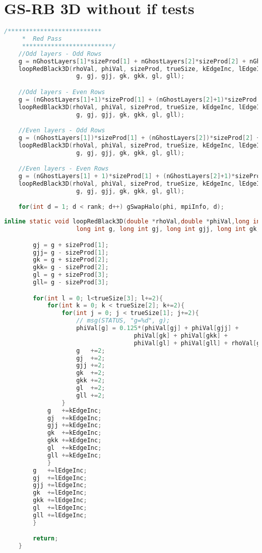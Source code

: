 	\section{GS-RB 3D without if tests}
	\begin{lstlisting}[language=c, caption = main routine]
	/**************************
	 *	Red Pass
	 *************************/
	//Odd layers - Odd Rows
	g = nGhostLayers[1]*sizeProd[1] + nGhostLayers[2]*sizeProd[2] + nGhostLayers[3]*sizeProd[3];
	loopRedBlack3D(rhoVal, phiVal, sizeProd, trueSize, kEdgeInc, lEdgeInc,
					g, gj, gjj, gk, gkk, gl, gll);

	//Odd layers - Even Rows
	g = (nGhostLayers[1]+1)*sizeProd[1] + (nGhostLayers[2]+1)*sizeProd[2] + nGhostLayers[3]*sizeProd[3];
	loopRedBlack3D(rhoVal, phiVal, sizeProd, trueSize, kEdgeInc, lEdgeInc,
					g, gj, gjj, gk, gkk, gl, gll);

	//Even layers - Odd Rows
	g = (nGhostLayers[1])*sizeProd[1] + (nGhostLayers[2])*sizeProd[2] + (nGhostLayers[3]+1)*sizeProd[3];
	loopRedBlack3D(rhoVal, phiVal, sizeProd, trueSize, kEdgeInc, lEdgeInc,
					g, gj, gjj, gk, gkk, gl, gll);

	//Even layers - Even Rows
	g = (nGhostLayers[1] + 1)*sizeProd[1] + (nGhostLayers[2]+1)*sizeProd[2] + (nGhostLayers[3]+1)*sizeProd[3];
	loopRedBlack3D(rhoVal, phiVal, sizeProd, trueSize, kEdgeInc, lEdgeInc,
					g, gj, gjj, gk, gkk, gl, gll);

	for(int d = 1; d < rank; d++) gSwapHalo(phi, mpiInfo, d);
	\end{lstlisting}

	\begin{lstlisting}[language=c, caption = loop routine]
		inline static void loopRedBlack3D(double *rhoVal,double *phiVal,long int *sizeProd, int *trueSize, int kEdgeInc, int lEdgeInc,
					long int g, long int gj, long int gjj, long int gk, long int gkk, long int gl, long int gll){

		gj = g + sizeProd[1];
		gjj= g - sizeProd[1];
		gk = g + sizeProd[2];
		gkk= g - sizeProd[2];
		gl = g + sizeProd[3];
		gll= g - sizeProd[3];

		for(int l = 0; l<trueSize[3]; l+=2){
			for(int k = 0; k < trueSize[2]; k+=2){
				for(int j = 0; j < trueSize[1]; j+=2){
					// msg(STATUS, "g=%d", g);
					phiVal[g] = 0.125*(phiVal[gj] + phiVal[gjj] +
									phiVal[gk] + phiVal[gkk] +
									phiVal[gl] + phiVal[gll] + rhoVal[g]);
					g	+=2;
					gj	+=2;
					gjj	+=2;
					gk	+=2;
					gkk	+=2;
					gl	+=2;
					gll	+=2;
				}
			g	+=kEdgeInc;
			gj	+=kEdgeInc;
			gjj	+=kEdgeInc;
			gk	+=kEdgeInc;
			gkk	+=kEdgeInc;
			gl	+=kEdgeInc;
			gll	+=kEdgeInc;
			}
		g	+=lEdgeInc;
		gj	+=lEdgeInc;
		gjj	+=lEdgeInc;
		gk	+=lEdgeInc;
		gkk	+=lEdgeInc;
		gl	+=lEdgeInc;
		gll	+=lEdgeInc;
		}

		return;
	}

	\end{lstlisting}

